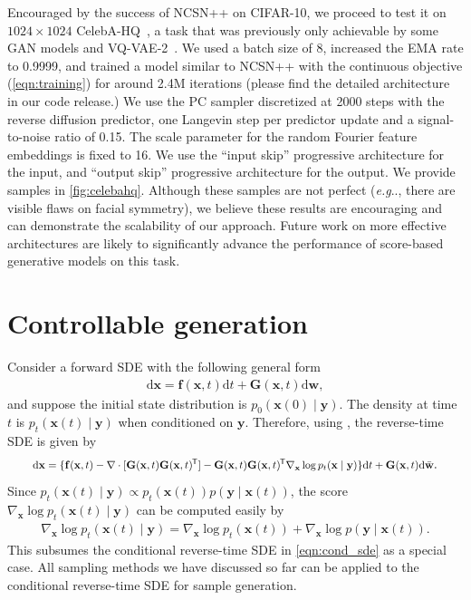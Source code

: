 \documentclass{article} %
\makeatletter
\newcommand*{\tran}{^{\mkern-1.5mu\mathsf{T}}}
\newcommand{\mbf}[1]{\mathbf{#1}}
\newcommand{\ud}{\mathrm{d}}
\def\@onedot{\ifx\@let@token.\else.\null\fi\xspace}
\DeclareRobustCommand\onedot{\futurelet\@let@token\@onedot}
\newcommand{\bfx}{\mathbf{x}}
\newcommand{\bfw}{\mathbf{w}}
\newcommand{\bff}{\mathbf{f}}
\newcommand{\bfy}{\mathbf{y}}
\newcommand{\bfG}{\mathbf{G}}
\def\eg{\emph{e.g}\onedot}
\makeatother
\begin{document}
Encouraged by the success of NCSN++ on CIFAR-10, we proceed to test it on $1024\times 1024$ CelebA-HQ~\citep{karras2018progressive}, a task that was previously only achievable by some GAN models and VQ-VAE-2~\citep{razavi2019generating}. We used a batch size of 8, increased the EMA rate to 0.9999, and trained a model similar to NCSN++ with the continuous objective (\cref{eqn:training}) for around 2.4M iterations (please find the detailed architecture in our code release.) We use the PC sampler discretized at 2000 steps with the reverse diffusion predictor, one Langevin step per predictor update and a signal-to-noise ratio of 0.15. The scale parameter for the random Fourier feature embeddings is fixed to 16. We use the ``input skip'' progressive architecture for the input, and ``output skip'' progressive architecture for the output. We provide samples in \cref{fig:celebahq}. Although these samples are not perfect (\eg, there are visible flaws on facial symmetry), we believe these results are encouraging and can demonstrate the scalability of our approach. Future work on more effective architectures are likely to significantly advance the performance of score-based generative models on this task.


\section{Controllable generation}\label{app:cond_gen}
Consider a forward SDE with the following general form
\begin{align*}
     \ud \bfx = \bff(\bfx, t) \ud t + \mbf{G}(\bfx, t) \ud \bfw,
\end{align*}
and suppose the initial state distribution is $p_0(\bfx(0) \mid \bfy)$. The density at time $t$ is $p_t(\bfx(t) \mid \bfy)$ when conditioned on $\bfy$. Therefore, using \citet{Anderson1982-ny}, the reverse-time SDE is given by
\begin{align}
\resizebox{0.92\linewidth}{!}{$\displaystyle \ud \bfx = \{\bff(\bfx, t) - \nabla \cdot [\bfG(\bfx, t) \bfG(\bfx,t)\tran] - \bfG(\bfx,t)\bfG(\bfx,t)\tran  \nabla_\bfx  \log p_t(\bfx \mid \bfy)\} \ud t + \mbf{G}(\bfx, t) \ud \bar{\bfw}$} \label{eqn:cond_sde_2}.
\end{align}
Since $p_t(\bfx(t) \mid \bfy) \propto p_t(\bfx(t)) p(\bfy \mid \bfx(t))$, the score $\nabla_\bfx \log p_t(\bfx(t) \mid \bfy)$ can be computed easily by
\begin{align}
    \nabla_{\bfx} \log p_t(\bfx(t) \mid \bfy) = \nabla_{\bfx} \log p_t(\bfx(t)) + \nabla_{\bfx} \log p(\bfy \mid \bfx(t)).
\end{align}
This subsumes the conditional reverse-time SDE in \cref{eqn:cond_sde} as a special case. All sampling methods we have discussed so far can be applied to the conditional reverse-time SDE for sample generation.
\end{document}

